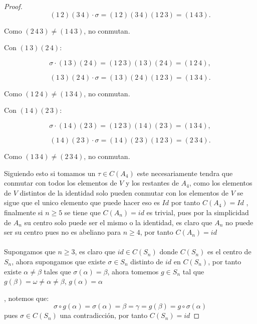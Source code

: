 \documentclass[11pt,letterpaper]{article}
\begin{document}
\begin{proof}
\[
(1\,2)(3\,4) \cdot \sigma = (1\,2)(3\,4)(1\,2\,3) = (1\,4\,3).
\]


Como $(2\,4\,3) \neq (1\,4\,3)$, no conmutan.

\item Con $(1\,3)(2\,4)$:


\[
\sigma \cdot (1\,3)(2\,4) = (1\,2\,3)(1\,3)(2\,4) = (1\,2\,4),
\]




\[
(1\,3)(2\,4) \cdot \sigma = (1\,3)(2\,4)(1\,2\,3) = (1\,3\,4).
\]


Como $(1\,2\,4) \neq (1\,3\,4)$, no conmutan.

\item Con $(1\,4)(2\,3)$:


\[
\sigma \cdot (1\,4)(2\,3) = (1\,2\,3)(1\,4)(2\,3) = (1\,3\,4),
\]




\[
(1\,4)(2\,3) \cdot \sigma = (1\,4)(2\,3)(1\,2\,3) = (2\,3\,4).
\]


Como $(1\,3\,4) \neq (2\,3\,4)$, no conmutan.

     Siguiendo esto si
    tomamos un $\tau\in C(A_4)$ este necesariamente tendra que conmutar con todos los elementos de $V$ y los restantes de $A_4$, como los elementos de $V$ distintos de la identidad solo pueden conmutar con los elementos de $V$ se sigue que el unico elemento que puede hacer eso es $Id$ por tanto $C(A_4)=Id$ , finalmente si $n\geq 5$ se tiene que $C(A_n)=id$ es trivial, pues por la simplicidad
    de $A_n$ su centro solo puede ser el mismo o la identidad, es claro que $A_n$ no puede ser su centro pues no es abeliano para $n\geq 4$, por tanto $C(A_n)=id$\,\\
    \,\\
    Supongamos que $n\geq 3$, es claro que $id\in C(S_n)$ donde $C(S_n)$ es el centro de $S_n$, ahora supongamos que existe $\sigma\in S_n$ distinto de $id$ en $C(S_n)$, por tanto existe $\alpha\neq \beta$ tales que $\sigma(\alpha)=\beta$, ahora  tomemos $g\in S_n$ tal que $g(\beta)=\omega\neq \alpha\neq \beta$, $g(\alpha)=\alpha$ 
    
    , notemos que:
    \begin{equation*}
        \sigma\circ g(\alpha)=\sigma(\alpha)=\beta=\gamma=g( \beta)=g\circ\sigma(\alpha)
    \end{equation*}
    pues $\sigma \in C(S_n)$ una contradicción, por tanto $C(S_n)=id$
\end{proof}
\end{document}

